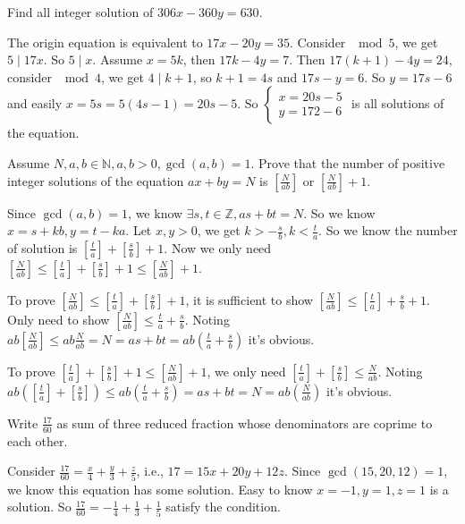 \documentclass{ctexart}
\begin{document}
\begin{problem}\label{pro:p23.1.b}
  Find all integer solution of \(306x-360y=630\).
\end{problem}
\begin{solution}
  The origin equation is equivalent to \(17x-20y=35\).
  Consider \(\mod 5\), we get \(5 \mid 17 x\). So \(5 \mid x\).
  Assume \(x=5k\), then \(17k-4y=7\).
  Then \(17(k+1)-4y=24\), consider \(\mod 4\), we get \(4 \mid k+1\), so \(k+1=4s\) and \(17s-y=6\).
  So \(y=17s-6\) and easily \(x=5s=5(4s-1)=20s-5\).
  So \(\begin{cases}
    x=20s-5 \\
    y=172-6
  \end{cases}\) is all solutions of the equation.
\end{solution}
\begin{problem}\label{pro:p23.3}
  Assume \(N,a,b \in \mathbb{N},a,b>0,\gcd(a,b)=1\).
  Prove that the number of positive integer solutions of the equation \(ax+by=N\)
  is \(\left[\frac{N}{ab}\right]\) or \(\left[\frac{N}{ab}\right]+1\).
\end{problem}

\begin{solution}
  Since \(\gcd(a,b)=1\), we know \(\exists s,t \in \mathbb{Z},as+bt=N\).
  So we know \(x=s+kb,y=t-ka\). Let \(x,y>0\), we get \(k> -\frac{s}{b},k<\frac{t}{a}\).
  So we know the number of solution is \(\left[\frac{t}{a}\right]+\left[\frac{s}{b}\right]+1\).
  Now we only need \(\left[\frac{N}{ab}\right]\leq\left[\frac{t}{a}\right]+\left[\frac{s}{b}\right]+1 \leq \left[\frac{N}{ab}\right]+1\).

  To prove \(\left[\frac{N}{ab}\right]\leq\left[\frac{t}{a}\right]+\left[\frac{s}{b}\right]+1\), it is sufficient to show
  \(\left[\frac{N}{ab}\right]\leq\left[\frac{t}{a}\right]+\frac{s}{b}+1\).
  Only need to show \(\left[\frac{N}{ab}\right]\leq\frac{t}{a}+\frac{s}{b}\).
  Noting \(ab \left[\frac{N}{ab}\right] \leq ab \frac{N}{ab}=N=as+bt=ab(\frac{t}{a}+\frac{s}{b})\) it's obvious.

  To prove \(\left[\frac{t}{a}\right]+\left[\frac{s}{b}\right]+1 \leq \left[\frac{N}{ab}\right]+1\),
  we only need \(\left[\frac{t}{a}\right]+\left[\frac{s}{b}\right] \leq \frac{N}{ab}\).
  Noting \(ab(\left[\frac{t}{a}\right]+\left[\frac{s}{b}\right]) \leq ab(\frac{t}{a}+\frac{s}{b})=as+bt=N=ab(\frac{N}{ab})\) it's obvious.
\end{solution}
\begin{problem}\label{pro:p24.2}
  Write \(\frac{17}{60}\) as sum of three reduced fraction whose denominators are coprime to each other.
\end{problem}
\begin{solution}
  Consider \(\frac{17}{60}=\frac{x}{4}+\frac{y}{3}+\frac{z}{5}\), i.e., \(17=15x+20y+12z\).
  Since \(\gcd(15,20,12)=1\), we know this equation has some solution.
  Easy to know \(x=-1,y=1,z=1\) is a solution.
  So \(\frac{17}{60}=-\frac{1}{4}+\frac{1}{3}+\frac{1}{5}\) satisfy the condition.
\end{solution}
\end{document}
